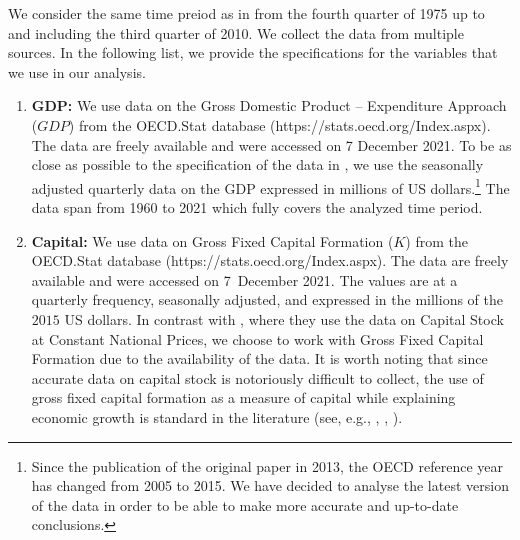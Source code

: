\documentclass[a4paper,12pt]{article}
\begin{document}
We consider the same time preiod as in \cite{Zhang2012} from the fourth quarter of 1975 up to and including the third quarter of 2010. We collect the data from multiple sources. In the following list, we provide the specifications for the variables that we use in our analysis.

\begin{enumerate}
\item \textbf{GDP:} We use data on the Gross Domestic Product -- Expenditure Approach ($GDP$) from the OECD.Stat \nocite{OECD} database (https://stats.oecd.org/Index.aspx). The data are freely available and were accessed on 7 December 2021. To be as close as possible to the specification of the data in \cite{Zhang2012}, we use the seasonally adjusted quarterly data on the GDP expressed in millions of  US dollars.\footnote{Since the publication of the original paper in 2013, the OECD reference year has changed from 2005 to 2015. We have decided to analyse the latest version of the data in order to be able to make more accurate and up-to-date conclusions.} The data span from 1960 to 2021 which fully covers the analyzed time period. 
\item \textbf{Capital:} We use data on Gross Fixed Capital Formation ($K$) from the OECD.Stat \nocite{OECD} database (https://stats.oecd.org/Index.aspx). The data are freely available and were accessed on 7~December 2021. The values are at a quarterly frequency, seasonally adjusted, and expressed in the millions of the $2015$ US dollars. In contrast with \cite{Zhang2012}, where they use the data on Capital Stock at Constant National Prices, we choose to work with Gross Fixed Capital Formation due to the availability of the data. It is worth noting that since accurate data on capital stock is notoriously difficult to collect, the use of gross fixed capital formation as a measure of capital while explaining economic growth is standard in the literature (see, e.g., \cite{Sharma1994}, \cite{Lee2002}, \cite{Lee2005}).

\end{enumerate}
\end{document}
